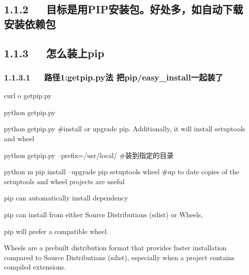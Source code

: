 \documentclass[letterpaper,12pt,english]{sphinxmanual}
\begin{document}
\subsection{1.1.2   目标是用PIP安装包。好处多，如自动下载安装依赖包}
\label{\detokenize{001software/001install/python:pip}}

\subsection{1.1.3   怎么装上pip}
\label{\detokenize{001software/001install/python:id3}}

\subsubsection{1.1.3.1   路径1:get\sphinxhyphen{}pip.py法 把pip/easy\_install一起装了}
\label{\detokenize{001software/001install/python:get-pip-py-pip-easy-install}}
\begin{DUlineblock}{0em}
\item[] 
\item[] curl  \sphinxhyphen{}o get\sphinxhyphen{}pip.py
\item[] python get\sphinxhyphen{}pip.py
\end{DUlineblock}

\begin{DUlineblock}{0em}
\item[] 
\item[] python get\sphinxhyphen{}pip.py \#install or upgrade pip. Additionally, it will
install setuptools and wheel
\item[] python get\sphinxhyphen{}pip.py –prefix=/usr/local/ \#装到指定的目录
\item[] python \sphinxhyphen{}m pip install –upgrade pip setuptools wheel \#up to date copies
of the setuptools and wheel projects are useful
\end{DUlineblock}

\begin{DUlineblock}{0em}
\item[] pip can automatically install dependency
\item[] pip can install from either Source Distributions (sdist) or Wheels,
\item[] pip will prefer a compatible wheel.
\item[] Wheels are a pre\sphinxhyphen{}built distribution format that provides faster
installation compared to Source Distributions (sdist), especially when
a project contains compiled extensions.
\end{DUlineblock}
\end{document}
